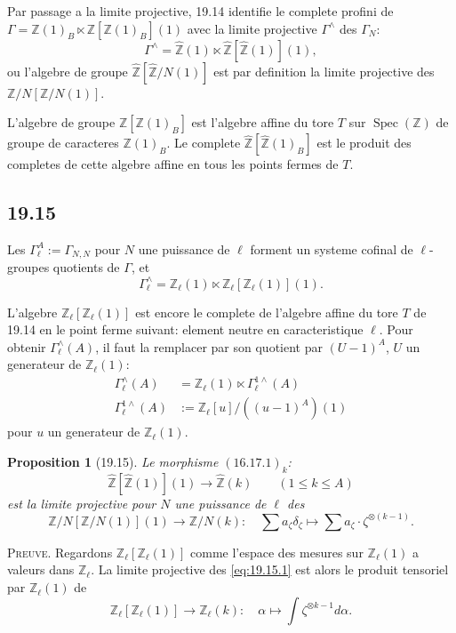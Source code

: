 \documentclass[12pt,a4paper]{article}
\theoremstyle{plain}
\newtheorem{proposition}[theorem]{Proposition}
\theoremstyle{definition}
\theoremstyle{remark}
\DeclareMathOperator{\Spec}{Spec}
\newcommand{\Betti}{B}
\newcommand{\ZZ}{\mathbb{Z}}
\begin{document}
Par passage a la limite projective, 19.14 identifie le complete
profini de $\Gamma = \ZZ(1)_\Betti \ltimes \ZZ[\ZZ(1)_\Betti](1)$ avec
la limite projective $\Gamma^\wedge$ des $\Gamma_N$:
\[
\Gamma^\wedge = \hat{\ZZ}(1) \ltimes \hat{\ZZ}[\hat{\ZZ}(1)](1),
\]
ou l'algebre de groupe $\hat{\ZZ}[\hat{\ZZ}/N(1)]$ est par definition la
limite projective des $\ZZ/N[\ZZ/N(1)]$.

L'algebre de groupe $\ZZ[\ZZ(1)_\Betti]$ est l'algebre affine du tore
$T$ sur $\Spec(\ZZ)$ de groupe de caracteres $\ZZ(1)_\Betti$. Le
complete $\hat{\ZZ}[\hat{\ZZ}(1)_\Betti]$ est le produit des completes de
cette algebre affine en tous les points fermes de $T$.

\subsection{19.15}

Les $\Gamma_\ell^A := \Gamma_{N,N}$ pour $N$ une puissance de $\ell$
forment un systeme cofinal de $\ell$-groupes quotients de $\Gamma$, et
\[
\Gamma_\ell^\wedge = \ZZ_\ell(1) \ltimes \ZZ_\ell[\ZZ_\ell(1)](1).
\]

L'algebre $\ZZ_\ell[\ZZ_\ell(1)]$ est encore le complete de l'algebre
affine du tore $T$ de 19.14 en le point ferme suivant: element neutre
en caracteristique $\ell$. Pour obtenir $\Gamma_\ell^\wedge(A)$, il
faut la remplacer par son quotient par $(U-1)^A$, $U$ un generateur de
$\ZZ_\ell(1)$:
\begin{align*}
\Gamma_\ell^\wedge(A) &= \ZZ_\ell(1) \ltimes \Gamma_\ell^{1\wedge}(A) \\
\Gamma_\ell^{1\wedge}(A) &:= \ZZ_\ell[u]/((u-1)^A)(1)
\end{align*}
pour $u$ un generateur de $\ZZ_\ell(1)$.

\begin{proposition}[19.15]\label{prop:19.15}
Le morphisme $(16.17.1)_k$:
\[
\hat{\ZZ}[\hat{\ZZ}(1)](1) \to \hat{\ZZ}(k) \qquad (1 \leq k \leq A)
\]
est la limite projective pour $N$ une puissance de $\ell$ des
\begin{equation}\label{eq:19.15.1}
\ZZ/N[\ZZ/N(1)](1) \to \ZZ/N(k) : \quad \sum a_\zeta \delta_\zeta
\longmapsto \sum a_\zeta \cdot \zeta^{\otimes(k-1)}.
\end{equation}
\end{proposition}

\noindent \textsc{Preuve.} Regardons $\ZZ_\ell[\ZZ_\ell(1)]$ comme
l'espace des mesures sur $\ZZ_\ell(1)$ a valeurs dans $\ZZ_\ell$. La
limite projective des \eqref{eq:19.15.1} est alors le produit tensoriel
par $\ZZ_\ell(1)$ de
\begin{equation}\label{eq:19.15.2}
\ZZ_\ell[\ZZ_\ell(1)] \to \ZZ_\ell(k) : \quad \alpha \longmapsto
\int \zeta^{\otimes k-1} d\alpha.
\end{equation}
\end{document}
